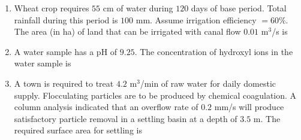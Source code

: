 \documentclass[journal]{IEEEtran}
\begin{document}
\begin{enumerate}
\item Wheat crop requires $55$ cm of water during $120$ days of base period. Total rainfall during this period is $100$ mm. Assume irrigation efficiency $=60\%$. The area (in ha) of land that can be irrigated with canal flow $0.01$ m$^{3}$/s is \hfill {}
\begin{enumerate}
\end{enumerate}

\item A water sample has a pH of $9.25$. The concentration of hydroxyl ions in the water sample is \hfill {}
\begin{enumerate}
\end{enumerate}


\item A town is required to treat $4.2$ m$^{3}$/min of raw water for daily domestic supply. Flocculating particles are to be produced by chemical coagulation. A column analysis indicated that an overflow rate of $0.2$ mm/s will produce satisfactory particle removal in a settling basin at a depth of $3.5$ m. The required surface area  for settling is \hfill {}
\begin{enumerate}
\end{enumerate}


\end{enumerate}
\end{document}
